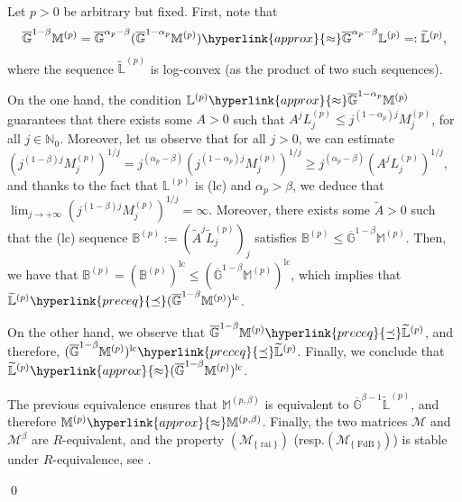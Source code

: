 \documentclass[11pt,a4paper]{article}
\theoremstyle{plain}
\theoremstyle{definition}
\newcommand{\NN}{\mathbb{N}}
\newcommand{\M}{\mathbb{M}}
\newcommand{\LL}{\mathbb{L}}
\newcommand{\G}{\mathbb{G}}
\let\on=\operatorname
\begin{document}
 {Let $p>0$ be arbitrary but fixed. First, note that $$\overline{\G}^{1-\beta}\M^{(p)}= \overline{\G}^{\alpha_p-\beta}(\overline{\G}^{1-\alpha_p}\M^{(p)}) \hyperlink{approx}{\approx}\overline{\G}^{\alpha_p-\beta}\LL^{(p)}=:\widetilde{\LL}^{(p)},$$
where the sequence $\widetilde{\LL}^{(p)}$ is log-convex (as the product of two such sequences).

On the one hand, the condition $\LL^{(p)}\hyperlink{approx}{\approx}\overline{\G}^{1-\alpha_p}\M^{(p)}$ guarantees that there exists some $A>0$ such that $A^jL_j^{(p)}\leq j^{(1-\alpha_p)j}M^{(p)}_j$, for all $j\in\NN_0$. Moreover, let us observe that for all $j>0$, we can estimate $(j^{(1-\beta)j}M^{(p)}_j)^{1/j}=j^{(\alpha_p-\beta)}(j^{(1-\alpha_p)j}M^{(p)}_j)^{1/j}\geq j^{(\alpha_p-\beta)}(A^jL^{(p)}_j)^{1/j}$, and thanks to the fact that $\LL^{(p)}$ is (lc) and $\alpha_p>\beta$, we deduce that $\lim_{j\rightarrow+\infty}(j^{(1-\beta)j}M^{(p)}_j)^{1/j}=\infty$. Moreover, there exists some $\widetilde{A}>0$ such that the (lc) sequence $\mathbb{B}^{(p)}:=(\widetilde{A}^j\widetilde{L}_j^{(p)})_j$ satisfies $\mathbb{B}^{(p)}\leq \overline{\G}^{1-\beta}\M^{(p)}$.
Then, we have that $\mathbb{B}^{(p)}=(\mathbb{B}^{(p)})^{\on{lc}}\leq (\overline{\G}^{1-\beta}\M^{(p)})^{\on{lc}}$, which implies that $\widetilde{\LL}^{(p)}\hyperlink{preceq}{\preceq}(\overline{\G}^{1-\beta}\M^{(p)})^{\on{lc}}$.

On the other hand, we observe that $\overline{\G}^{1-\beta}\M^{(p)}\hyperlink{preceq}{\preceq}\widetilde{\LL}^{(p)}$, and therefore,  $(\overline{\G}^{1-\beta}\M^{(p)})^{\on{lc}}\hyperlink{preceq}{\preceq}\widetilde{\LL}^{(p)}$. Finally, we conclude that $\widetilde{\LL}^{(p)}\hyperlink{approx}{\approx}(\overline{\G}^{1-\beta}\M^{(p)})^{\on{lc}}$.

The previous equivalence ensures that $\M^{(p,\beta)}$ is equivalent to $\overline{\G}^{\beta-1}\widetilde{\LL}^{(p)}$, and therefore $\M^{(p)}\hyperlink{approx}{\approx}\M^{(p,\beta)}$. %
Finally, the two matrices $\mathcal{M}$ and $\mathcal{M}^{\beta}$ are $R$-equivalent, and the property \hyperlink{R-rai}{$(\mathcal{M}_{\{\on{rai}\}})$} (resp.\hyperlink{R-FdB}{$(\mathcal{M}_{\{\on{FdB}\}})$})
is stable under $R$-equivalence, see \cite[Remark 8.2.2]{dissertation}.}
\qed\enddemo
\end{document}
